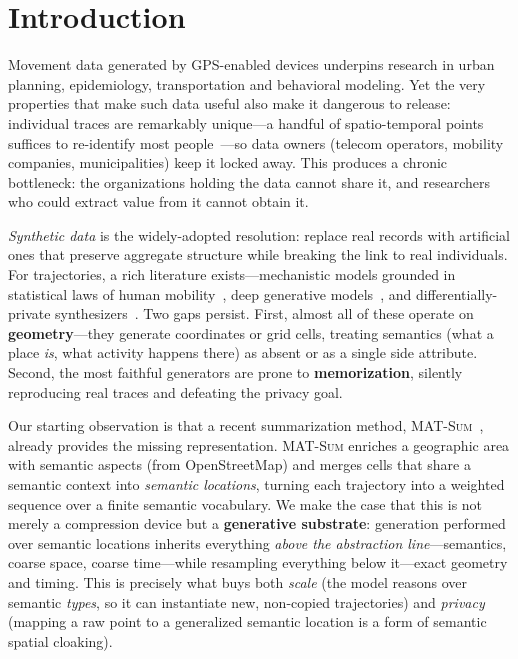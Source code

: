 \documentclass[sigconf,nonacm]{acmart}
\begin{document}

\maketitle

\section{Introduction}
Movement data generated by GPS-enabled devices underpins research in urban planning, epidemiology,
transportation and behavioral modeling. Yet the very properties that make such data useful also make
it dangerous to release: individual traces are remarkably unique---a handful of spatio-temporal points
suffices to re-identify most people~\cite{montjoye2013}---so data owners (telecom operators, mobility
companies, municipalities) keep it locked away. This produces a chronic bottleneck: the organizations
holding the data cannot share it, and researchers who could extract value from it cannot obtain it.

\emph{Synthetic data} is the widely-adopted resolution: replace real records with artificial ones
that preserve aggregate structure while breaking the link to real individuals. For trajectories, a
rich literature exists---mechanistic models grounded in statistical laws of human
mobility~\cite{song2010,pappalardo2018,jiang2016}, deep generative
models~\cite{feng2020,rao2020,zhu2023}, and differentially-private synthesizers~\cite{gursoy2018}.
Two gaps persist. First, almost all of these operate on \textbf{geometry}---they generate coordinates
or grid cells, treating semantics (what a place \emph{is}, what activity happens there) as absent or
as a single side attribute. Second, the most faithful generators are prone to \textbf{memorization},
silently reproducing real traces and defeating the privacy goal.

Our starting observation is that a recent summarization method, \textsc{MAT-Sum}~\cite{pugliese2023},
already provides the missing representation. \textsc{MAT-Sum} enriches a geographic area with semantic
aspects (from OpenStreetMap) and merges cells that share a semantic context into \emph{semantic
locations}, turning each trajectory into a weighted sequence over a finite semantic vocabulary. We
make the case that this is not merely a compression device but a \textbf{generative substrate}:
generation performed over semantic locations inherits everything \emph{above the abstraction
line}---semantics, coarse space, coarse time---while resampling everything below it---exact geometry
and timing. This is precisely what buys both \emph{scale} (the model reasons over semantic
\emph{types}, so it can instantiate new, non-copied trajectories) and \emph{privacy} (mapping a raw
point to a generalized semantic location is a form of semantic spatial cloaking).
\end{document}
